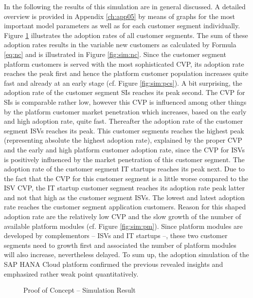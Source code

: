 In the following the results of this simulation are in general discussed. A detailed overview is provided in Appendix \ref{ch:app05} by means of graphs for the most important model parameters as well as for each customer segment individually. Figure \ref{fig:sim:ar} illustrates the adoption rates of all customer segments. The sum of these adoption rates results in the variable new customers as calculated by Formula \ref{eq:nc} and is illustrated in Figure \ref{fig:sim:nc}. Since the customer segment platform customers is served with the most sophisticated \ac{CVP}, its adoption rate reaches the peak first and hence the platform customer population increases quite fast and already at an early stage (cf. Figure \ref{fig:sim:pcs}). A bit surprising, the adoption rate of the customer segment \acp{SI} reaches its peak second. The \ac{CVP} for \acp{SI} is comparable rather low, however this \ac{CVP} is influenced among other things by the platform customer market penetration which increases, based on the early and high adoption rate, quite fast. Thereafter the adoption rate of the customer segment \acp{ISV} reaches its peak. This customer segments reaches the highest peak (representing absolute the highest adoption rate), explained by the proper \ac{CVP} and the early and high platform customer adoption rate, since the \ac{CVP} for \acp{ISV} is positively influenced by the market penetration of this customer segment. The adoption rate of the customer segment \ac{IT} startups reaches its peak next. Due to the fact that the \ac{CVP} for this customer segment is a little worse compared to the \ac{ISV} \ac{CVP}, the \ac{IT} startup customer segment reaches its adoption rate peak latter and not that high as the customer segment \acp{ISV}. The lowest and latest adoption rate reaches the customer segment application customers. Reason for this shaped adoption rate are the relatively low \ac{CVP} and the slow growth of the number of available platform modules (cf. Figure \ref{fig:sim:pm}). Since platform modules are developed by complementors -- \acp{ISV} and \ac{IT} startups --, these two customer segments need to growth first and associated the number of platform modules will also increase, nevertheless delayed. To sum up, the adoption simulation of the SAP HANA Cloud platform confirmed the previous revealed insights and emphasized rather weak point quantitatively.

\begin{figure}[tb]
	\centering
	
	\caption{Proof of Concept -- Simulation Result}
	\label{fig:sim:ar}
\end{figure}

